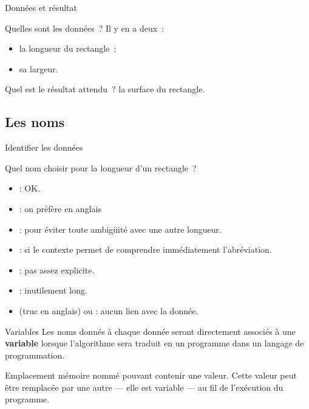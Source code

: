 \begin{hideedit}
\begin{frame}{Données et résultat}
\begin{example}
    Quelles sont les données~? \pause Il y en a deux~:
    \begin{itemize}
            \item la longueur du rectangle~;
            \item sa largeur.
    \end{itemize}

    \pause
    Quel est le résultat attendu~? \pause la surface du rectangle.
  \end{example}
\end{frame}

\subsection{Les noms}
\begin{frame}{Identifier les données}

  \begin{example}
  Quel nom choisir pour la longueur d’un rectangle~?

  \pause
  \begin{itemize}
    \item
       \pause: OK.
    \pause
    \item
       \pause: on préfère en anglais
    \pause
    \item
       \pause: pour éviter toute ambigüité avec une
      autre longueur.
    \pause
    \item
       \pause: si le contexte permet de comprendre immédiatement
      l’abréviation.
    \pause
    \item
       \pause: pas assez explicite.
    \pause
    \item
       \pause: inutilement long.
    \pause
    \item
       (truc en anglais) ou \pause: aucun lien avec la donnée.
  \end{itemize}
  \end{example}
\end{frame}

\begin{frame}{Variables}
  Les noms donnés à chaque donnée seront directement associés à une
  \textbf{variable} lorsque l'algorithme sera traduit en un programme dans
  un langage de programmation.

  \pause
  \begin{definition}[Variable]
    Emplacement
    mémoire nommé pouvant contenir une valeur. Cette valeur peut être
    remplacée par une autre --- elle est variable --- au fil de l'exécution du
    programme.
  \end{definition}
\end{frame}


\end{hideedit}
